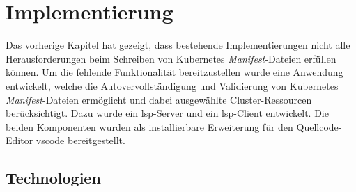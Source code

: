 \chapter{Implementierung}\label{ch:implementation}

Das vorherige Kapitel hat gezeigt, dass bestehende Implementierungen nicht alle Herausforderungen beim Schreiben von Kubernetes \textit{Manifest}-Dateien erfüllen
können. Um die fehlende Funktionalität bereitzustellen wurde eine Anwendung entwickelt,
welche die Autovervollständigung und Validierung von Kubernetes \textit{Manifest}-Dateien ermöglicht und dabei ausgewählte
Cluster-Ressourcen berücksichtigt. Dazu wurde ein \ac{lsp}-Server und ein \ac{lsp}-Client entwickelt.
Die beiden Komponenten wurden als installierbare Erweiterung für den Quellcode-Editor \ac{vscode} bereitgestellt.

\section{Technologien}

